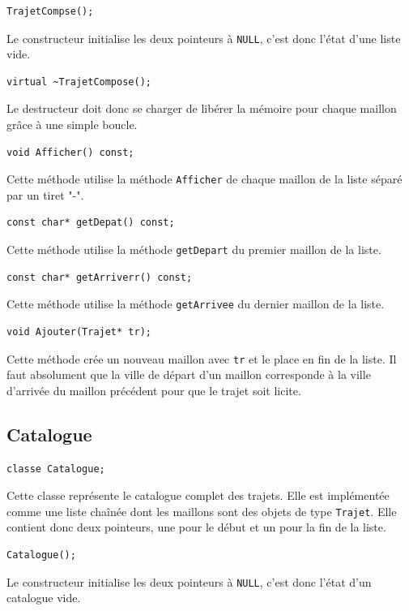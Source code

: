 \documentclass[11pt, a4paper]{article}
\begin{document}
\begin{lstlisting}
TrajetCompse();
\end{lstlisting}
Le constructeur initialise les deux pointeurs à \texttt{NULL}, c'est donc l'état d'une liste vide.

\begin{lstlisting}
virtual ~TrajetCompose();
\end{lstlisting}
Le destructeur doit donc se charger de libérer la mémoire pour chaque maillon grâce à une simple
boucle.

\begin{lstlisting}
void Afficher() const;
\end{lstlisting}
Cette méthode utilise la méthode \texttt{Afficher} de chaque maillon de la liste séparé par un
tiret "-".

\begin{lstlisting}
const char* getDepat() const;
\end{lstlisting}
Cette méthode utilise la méthode \texttt{getDepart} du premier maillon de la liste.

\begin{lstlisting}
const char* getArriverr() const;
\end{lstlisting}
Cette méthode utilise la méthode \texttt{getArrivee} du dernier maillon de la liste.

\begin{lstlisting}
void Ajouter(Trajet* tr);
\end{lstlisting}
Cette méthode crée un nouveau maillon avec \texttt{tr} et le place en fin de la liste. Il faut
absolument que la ville de départ d'un maillon corresponde à la ville d'arrivée du maillon précédent
pour que le trajet soit licite.\\

\subsection{Catalogue}
\begin{lstlisting}
classe Catalogue;
\end{lstlisting}
Cette classe représente le catalogue complet des trajets. Elle est implémentée comme une liste chaînée dont les
maillons sont des objets de type \texttt{Trajet}. Elle contient donc deux pointeurs, une pour le
début et un pour la fin de la liste.

\begin{lstlisting}
Catalogue();
\end{lstlisting}
Le constructeur initialise les deux pointeurs à \texttt{NULL}, c'est donc l'état d'un catalogue
vide.
\end{document}
